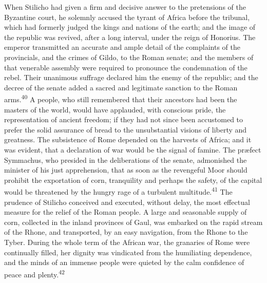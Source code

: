 When Stilicho had given a firm and decisive answer to the
pretensions of the Byzantine court, he solemnly accused the
tyrant of Africa before the tribunal, which had formerly judged
the kings and nations of the earth; and the image of the republic
was revived, after a long interval, under the reign of Honorius.
The emperor transmitted an accurate and ample detail of the
complaints of the provincials, and the crimes of Gildo, to the
Roman senate; and the members of that venerable assembly were
required to pronounce the condemnation of the rebel. Their
unanimous suffrage declared him the enemy of the republic; and
the decree of the senate added a sacred and legitimate sanction
to the Roman arms.\textsuperscript{40} A people, who still remembered that their
ancestors had been the masters of the world, would have
applauded, with conscious pride, the representation of ancient
freedom; if they had not since been accustomed to prefer the
solid assurance of bread to the unsubstantial visions of liberty
and greatness. The subsistence of Rome depended on the harvests
of Africa; and it was evident, that a declaration of war would be
the signal of famine. The præfect Symmachus, who presided in the
deliberations of the senate, admonished the minister of his just
apprehension, that as soon as the revengeful Moor should prohibit
the exportation of corn, tranquility and perhaps the safety, of
the capital would be threatened by the hungry rage of a turbulent
multitude.\textsuperscript{41} The prudence of Stilicho conceived and executed,
without delay, the most effectual measure for the relief of the
Roman people. A large and seasonable supply of corn, collected in
the inland provinces of Gaul, was embarked on the rapid stream of
the Rhone, and transported, by an easy navigation, from the Rhone
to the Tyber. During the whole term of the African war, the
granaries of Rome were continually filled, her dignity was
vindicated from the humiliating dependence, and the minds of an
immense people were quieted by the calm confidence of peace and
plenty.\textsuperscript{42}




